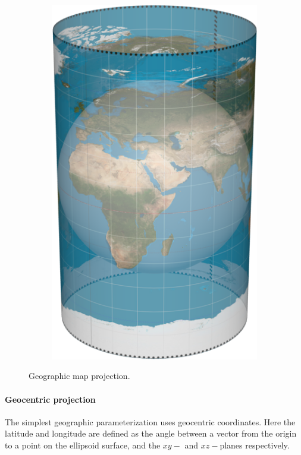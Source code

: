 \begin{figure}[htbp]
\begin{subfigure}[bt]{0.15\textwidth}
        \includegraphics[width=\textwidth]{figures/map_projection/projection_geo.png}
    \end{subfigure}
    \caption{Geographic map projection.}
    \label{fig:proj_equi}
\end{figure}

\paragraph{Geocentric projection}
The simplest geographic parameterization uses geocentric coordinates. Here the latitude and longitude are defined as the angle between a vector from the origin to a point on the ellipsoid surface, and the $xy-$ and $xz-$planes respectively.

